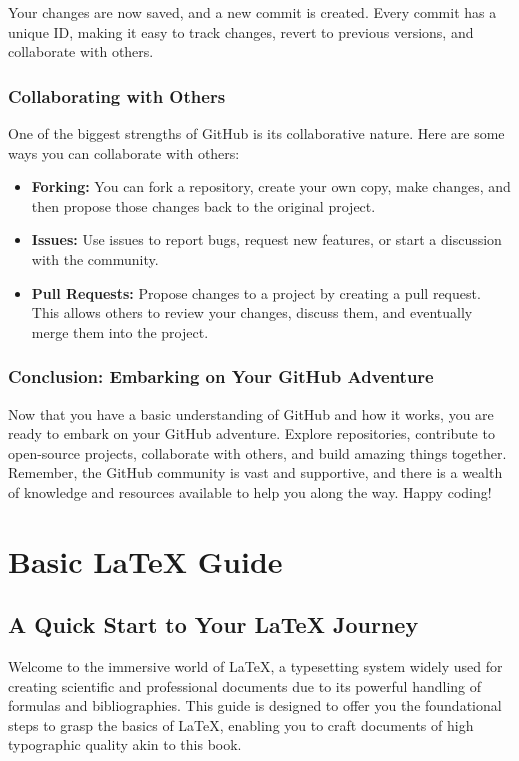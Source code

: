 \documentclass{book}
\begin{document}
Your changes are now saved, and a new commit is created. Every commit has a unique ID, making it easy to track changes, revert to previous versions, and collaborate with others.

\subsection*{Collaborating with Others}

One of the biggest strengths of GitHub is its collaborative nature. Here are some ways you can collaborate with others:

\begin{itemize}
    \item \textbf{Forking:} You can fork a repository, create your own copy, make changes, and then propose those changes back to the original project.
    \item \textbf{Issues:} Use issues to report bugs, request new features, or start a discussion with the community.
    \item \textbf{Pull Requests:} Propose changes to a project by creating a pull request. This allows others to review your changes, discuss them, and eventually merge them into the project.
\end{itemize}

\subsection*{Conclusion: Embarking on Your GitHub Adventure}

Now that you have a basic understanding of GitHub and how it works, you are ready to embark on your GitHub adventure. Explore repositories, contribute to open-source projects, collaborate with others, and build amazing things together. Remember, the GitHub community is vast and supportive, and there is a wealth of knowledge and resources available to help you along the way. Happy coding!

\chapter{Basic LaTeX Guide}
\section*{A Quick Start to Your LaTeX Journey}

Welcome to the immersive world of LaTeX, a typesetting system widely used for creating scientific and professional documents due to its powerful handling of formulas and bibliographies. This guide is designed to offer you the foundational steps to grasp the basics of LaTeX, enabling you to craft documents of high typographic quality akin to this book.
\end{document}
